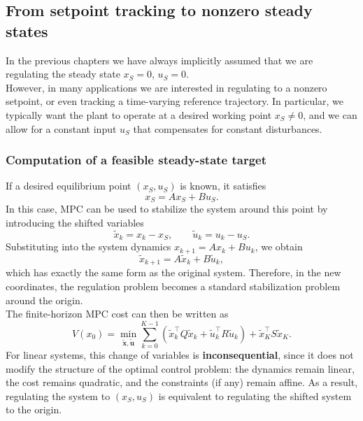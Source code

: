 \subsection{From setpoint tracking to nonzero steady states}
In the previous chapters we have always implicitly assumed that we are regulating the steady state $x_S = 0$, $u_S = 0$.\\
However, in many applications we are interested in regulating to a nonzero setpoint, or even tracking a time-varying reference trajectory. In particular, we typically want the plant to operate at a desired working point $x_S \neq 0$, and we can allow for a constant input $u_S$ that compensates for constant disturbances.
\subsubsection{Computation of a feasible steady-state target}
If a desired equilibrium point $(x_S,u_S)$ is known, it satisfies
$$
x_S = A x_S + B u_S.
$$
In this case, MPC can be used to stabilize the system around this point by introducing the shifted variables
$$
\tilde{x}_k = x_k - x_S, \qquad \tilde{u}_k = u_k - u_S.
$$
Substituting into the system dynamics $x_{k+1} = A x_k + B u_k$, we obtain
$$
\tilde{x}_{k+1} = A \tilde{x}_k + B \tilde{u}_k,
$$
which has exactly the same form as the original system. Therefore, in the new coordinates, the regulation problem becomes a standard stabilization problem around the origin.\\
The finite-horizon MPC cost can then be written as
$$
V(x_0) = \min_{\mathbf{\tilde{x}},\mathbf{\tilde{u}}} \sum_{k=0}^{K-1} \left( \tilde{x}_k^\top Q \tilde{x}_k + \tilde{u}_k^\top R \tilde{u}_k \right) + \tilde{x}_K^\top S \tilde{x}_K.
$$
For linear systems, this change of variables is \textbf{inconsequential}, since it does not modify the structure of the optimal control problem: the dynamics remain linear, the cost remains quadratic, and the constraints (if any) remain affine. As a result, regulating the system to $(x_S,u_S)$ is equivalent to regulating the shifted system to the origin.\\

